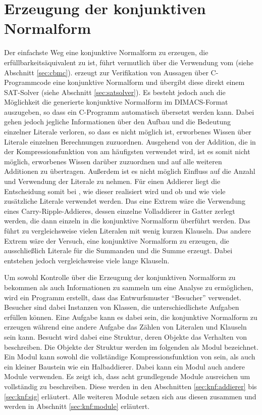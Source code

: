 \chapter{Erzeugung der konjunktiven Normalform}
\label{chp:knf}

Der einfachste Weg eine konjunktive Normalform zu erzeugen, die erfüllbarkeitsäquivalent zu  ist, führt vermutlich über die Verwendung vom 
(siehe Abschnitt \ref{sec:cbmc}).  erzeugt zur Verifikation von Aussagen über C-Programmcode eine konjunktive Normalform und übergibt diese direkt
einem SAT-Solver (siehe Abschnitt \ref{sec:satsolver}). Es besteht jedoch auch die Möglichkeit die generierte konjunktive Normalform im DIMACS-Format auszugeben,
so dass ein C-Programm automatisch übersetzt werden kann. Dabei gehen jedoch jegliche Informationen über den Aufbau und die Bedeutung einzelner Literale verloren,
so dass es nicht möglich ist, erworbenes Wissen über Literale einzelnen Berechnungen zuzuordnen. Ausgehend von der Addition, die in der Kompressionsfunktion von
 am häufigsten verwendet wird, ist es somit nicht möglich, erworbenes Wissen darüber zuzuordnen und auf alle weiteren Additionen zu übertragen.
Außerdem ist es nicht möglich Einfluss auf die Anzahl und Verwendung der Literale zu nehmen. Für einen Addierer liegt die Entscheidung somit bei ,
wie dieser realisiert wird und ob und wie viele zusätzliche Literale verwendet werden. Das eine Extrem wäre die Verwendung eines Carry-Ripple-Addieres, dessen einzelne
Volladdierer in Gatter zerlegt werden, die dann einzeln in die konjunktive Normalform überführt werden. Das führt zu vergleichsweise vielen Literalen mit wenig
kurzen Klauseln. Das andere Extrem wäre der Versuch, eine konjunktive Normalform zu erzeugen, die ausschließlich Literale für die Summanden und die Summe erzeugt.
Dabei entstehen jedoch vergleichsweise viele lange Klauseln.

Um sowohl Kontrolle über die Erzeugung der konjunktiven Normalform zu bekommen als auch Informationen zu sammeln um eine Analyse zu ermöglichen, wird ein Programm
erstellt, dass das Entwurfsmuster "`Besucher"' \cite[301]{visitor} verwendet. Besucher sind dabei Instanzen von Klassen, die unterschiedlichste Aufgaben erfüllen können.
Eine Aufgabe kann es dabei sein, die konjunktive Normalform zu erzeugen während eine andere Aufgabe das Zählen von Literalen und Klauseln sein kann.
Besucht wird dabei eine Struktur, deren Objekte das Verhalten von  beschreiben. Die Objekte der Struktur werden im folgenden als Modul bezeichnet.
Ein Modul kann sowohl die vollständige Kompressionsfunktion von  sein, als auch ein kleiner Baustein wie ein Halbaddierer. Dabei kann ein Modul
auch andere Module verwenden. Es zeigt ich, dass acht grundlegende Module ausreichen um  vollständig zu beschreiben. Diese werden in den Abschnitten
\ref{sec:knf:addierer} bis \ref{sec:knf:sig} erläutert. Alle weiteren Module setzen sich aus diesen zusammen und werden in Abschnitt \ref{sec:knf:module} erläutert.

